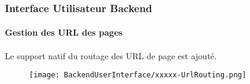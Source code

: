 
\begin{frame}[fragile]
	\frametitle{Interface Utilisateur Backend}
	\framesubtitle{Gestion des URL des pages}

 	Le support natif du routage des URL de page est ajouté.

	\begin{figure}
		\texttt{[image: BackendUserInterface/xxxxx-UrlRouting.png]}
	\end{figure}

\end{frame}



%
%

